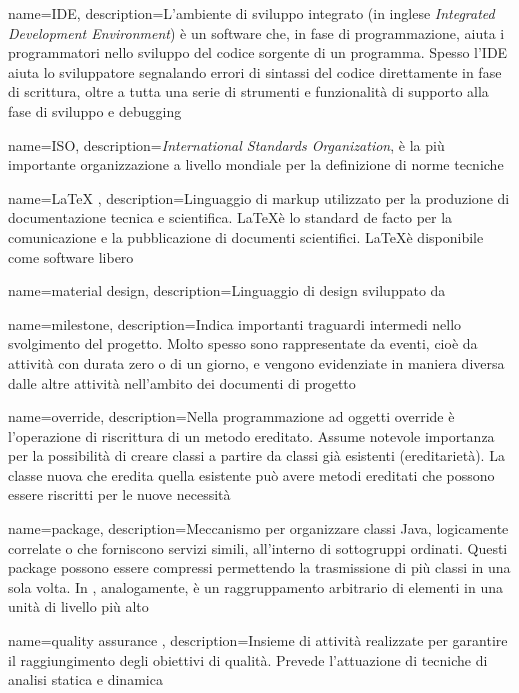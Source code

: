 {
	name=IDE,
	description={L’ambiente di sviluppo integrato (in inglese \emph{Integrated Development Environment}) è un software che, in fase di programmazione, aiuta i programmatori nello sviluppo del codice sorgente di un programma. Spesso l’IDE aiuta lo sviluppatore segnalando errori di sintassi del codice direttamente in fase di scrittura, oltre a tutta una serie di strumenti e funzionalità di supporto alla fase di sviluppo e debugging}
}

{
	name=ISO,
	description={\emph{International Standards Organization}, è la più importante organizzazione a livello mondiale per la definizione di norme tecniche}
}

{
	name=LaTeX ,
	description={Linguaggio di markup utilizzato per la produzione di documentazione tecnica e scientifica. \LaTeX è lo standard de facto per la comunicazione e la pubblicazione di documenti scientifici. \LaTeX è disponibile come software libero}
}

{
	name=material design,
	description={Linguaggio di design sviluppato da }
}

{
	name=milestone,
	description={Indica importanti traguardi intermedi nello svolgimento del progetto. Molto spesso sono rappresentate da eventi, cioè da attività con durata zero o di un giorno, e vengono evidenziate in maniera diversa dalle altre attività nell'ambito dei documenti di progetto}
}

{
	name=override,
	description={Nella programmazione ad oggetti override è l'operazione di riscrittura di un metodo ereditato. Assume notevole importanza per la possibilità di creare classi a partire da classi già esistenti (ereditarietà). La classe nuova che eredita quella esistente può avere metodi ereditati che possono essere riscritti per le nuove necessità}
}

{
	name=package,
	description={Meccanismo per organizzare classi Java, logicamente correlate o che forniscono servizi simili, all’interno di sottogruppi ordinati. Questi package possono essere compressi permettendo la trasmissione di più classi in una sola volta. In , analogamente, è un raggruppamento arbitrario di elementi in una unità di livello più alto}
}

{
	name=quality assurance ,
	description={Insieme di attività realizzate per garantire il raggiungimento degli obiettivi di qualità. Prevede l'attuazione di tecniche di analisi statica e dinamica}
}

